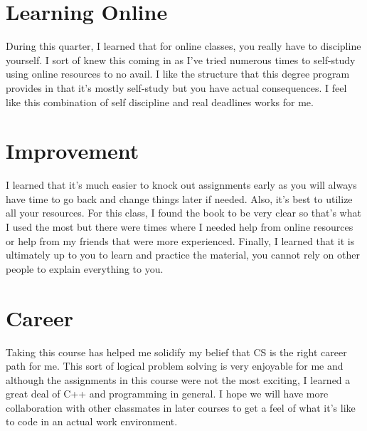 \documentclass[]{article}
\begin{document}
\section*{Learning Online}
During this quarter, I learned that for online classes, you really have to discipline yourself. I sort of knew this coming in as I've tried numerous times to self-study using online resources to no avail. I like the structure that this degree program provides in that it's mostly self-study but you have actual consequences. I feel like this combination of self discipline and real deadlines works for me.

\section*{Improvement}
I learned that it's much easier to knock out assignments early as you will always have time to go back and change things later if needed. Also, it's best to utilize all your resources. For this class, I found the book to be very clear so that's what I used the most but there were times where I needed help from online resources or help from my friends that were more experienced. Finally, I learned that it is ultimately up to you to learn and practice the material, you cannot rely on other people to explain everything to you.

\section*{Career}
Taking this course has helped me solidify my belief that CS is the right career path for me. This sort of logical problem solving is very enjoyable for me and although the assignments in this course were not the most exciting, I learned a great deal of C++ and programming in general. I hope we will have more collaboration with other classmates in later courses to get a feel of what it's like to code in an actual work environment. 
\end{document}
